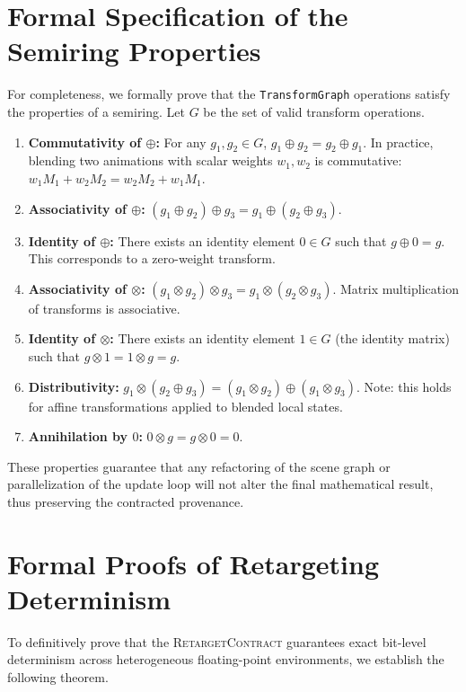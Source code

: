 \documentclass[sigconf,nonacm]{acmart}
\newcommand{\retargetcontract}{\textsc{RetargetContract}}
\newcommand{\tropmult}{\otimes}
\begin{document}
\section{Formal Specification of the Semiring Properties} For completeness, we
formally prove that the \texttt{TransformGraph} operations satisfy the properties of a
semiring. Let $G$ be the set of valid transform operations. \begin{enumerate}
\item \textbf{Commutativity of $\oplus$:} For any $g_1, g_2 \in G$, $g_1 \oplus
g_2 = g_2 \oplus g_1$. In practice, blending two animations with scalar weights
$w_1, w_2$ is commutative: $w_1 M_1 + w_2 M_2 = w_2 M_2 + w_1 M_1$.     \item
\textbf{Associativity of $\oplus$:} $(g_1 \oplus g_2) \oplus g_3 = g_1 \oplus
(g_2 \oplus g_3)$.     \item \textbf{Identity of $\oplus$:} There exists an
identity element $0 \in G$ such that $g \oplus 0 = g$. This corresponds to a
zero-weight transform.     \item \textbf{Associativity of $\tropmult$:} $(g_1
\tropmult g_2) \tropmult g_3 = g_1 \tropmult (g_2 \tropmult g_3)$. Matrix
multiplication of transforms is associative.     \item \textbf{Identity of
$\tropmult$:} There exists an identity element $1 \in G$ (the identity matrix)
such that $g \tropmult 1 = 1 \tropmult g = g$.     \item
\textbf{Distributivity:} $g_1 \tropmult (g_2 \oplus g_3) = (g_1 \tropmult g_2)
\oplus (g_1 \tropmult g_3)$. Note: this holds for affine transformations applied
to blended local states.     \item \textbf{Annihilation by $0$:} $0 \tropmult g
= g \tropmult 0 = 0$. \end{enumerate}

These properties guarantee that any refactoring of the scene graph or
parallelization of the update loop will not alter the final mathematical result,
thus preserving the contracted provenance.

\section{Formal Proofs of Retargeting Determinism}

To definitively prove that the \retargetcontract{} guarantees exact bit-level
determinism across heterogeneous floating-point environments, we establish the
following theorem.
\end{document}
